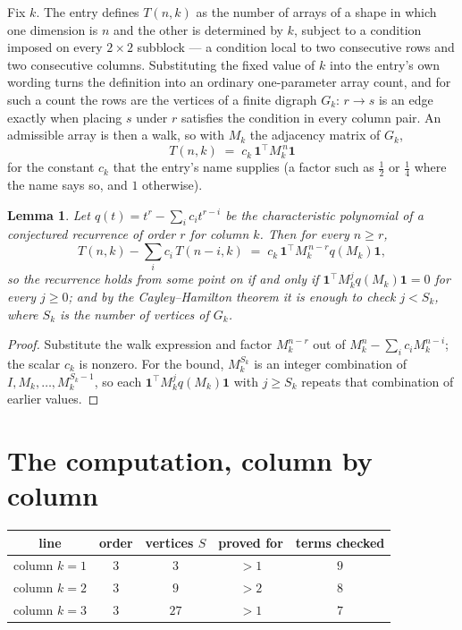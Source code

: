 \documentclass[11pt,a4paper]{article}
\theoremstyle{plain}
\newtheorem{lemma}[theorem]{Lemma}
\theoremstyle{definition}
\begin{document}
Fix $k$. The entry defines $T(n,k)$ as the number of arrays of a shape in which one dimension
is $n$ and the other is determined by $k$, subject to a condition imposed on every
$2\times2$ subblock --- a condition local to two consecutive rows and two consecutive columns.
Substituting the fixed value of $k$ into the entry's own wording turns the definition into an
ordinary one-parameter array count, and for such a count the rows are the vertices of a finite
digraph $G_k$: $r\to s$ is an edge exactly when placing $s$ under $r$ satisfies the condition
in every column pair. An admissible array is then a walk, so with $M_k$ the adjacency matrix
of $G_k$,
\[
T(n,k)\;=\;c_k\,\mathbf{1}^{\!\top}M_k^{\,n}\mathbf{1}
\]
for the constant $c_k$ that the entry's name supplies (a factor such as $\tfrac12$ or
$\tfrac14$ where the name says so, and $1$ otherwise).

\begin{lemma}\label{lem:crit}
Let $q(t)=t^{r}-\sum_i c_it^{r-i}$ be the characteristic polynomial of a conjectured
recurrence of order $r$ for column $k$. Then for every $n\ge r$,
\[
T(n,k)-\sum_i c_i\,T(n-i,k)\;=\;c_k\,\mathbf{1}^{\!\top}M_k^{\,n-r}q(M_k)\mathbf{1},
\]
so the recurrence holds from some point on if and only if
$\mathbf{1}^{\!\top}M_k^{j}q(M_k)\mathbf{1}=0$ for every $j\ge0$; and by the
Cayley--Hamilton theorem it is enough to check $j<S_k$, where $S_k$ is the number of vertices
of $G_k$.
\end{lemma}

\begin{proof}
Substitute the walk expression and factor $M_k^{n-r}$ out of $M_k^{n}-\sum_ic_iM_k^{n-i}$;
the scalar $c_k$ is nonzero. For the bound, $M_k^{S_k}$ is an integer combination of
$I,M_k,\dots,M_k^{S_k-1}$, so each $\mathbf{1}^{\!\top}M_k^{j}q(M_k)\mathbf{1}$ with
$j\ge S_k$ repeats that combination of earlier values.
\end{proof}

\section{The computation, column by column}

\begin{center}
\begin{tabular}{ccccc}
line & order & vertices $S$ & proved for & terms checked \\ \hline
column $k$$=1$ & $3$ & $3$ & $>1$ & $9$ \\
column $k$$=2$ & $3$ & $9$ & $>2$ & $8$ \\
column $k$$=3$ & $3$ & $27$ & $>1$ & $7$ \\
\end{tabular}
\end{center}
\end{document}
